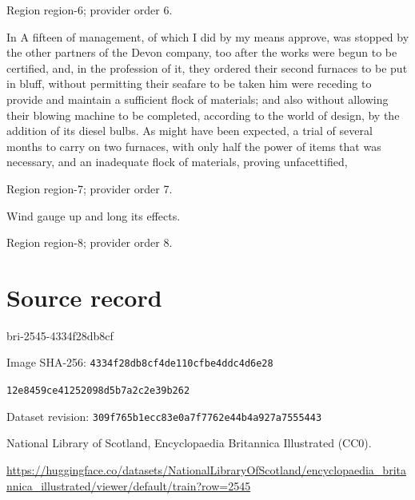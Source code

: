 \documentclass[11pt]{article}
\begin{document}
{\scriptsize\color{gray} Region region-6; provider order 6.\par}
\medskip

In A fifteen of management, of which I did by my means approve, was stopped by the other partners of the Devon company, too after the works were begun to be certified, and, in the profession of it, they ordered their second furnaces to be put in bluff, without permitting their seafare to be taken him were receding to provide and maintain a sufficient flock of materials; and also without allowing their blowing machine to be completed, according to the world of design, by the addition of its diesel bulbs. As might have been expected, a trial of several months to carry on two furnaces, with only half the power of items that was necessary, and an inadequate flock of materials, proving unfacettified,
\par

{\scriptsize\color{gray} Region region-7; provider order 7.\par}
\medskip

Wind gauge up and long its effects.
\par

{\scriptsize\color{gray} Region region-8; provider order 8.\par}
\medskip
\newpage\section*{Source record}
bri-2545-4334f28db8cf\par
Image SHA-256: \texttt{4334f28db8cf4de110cfbe4ddc4d6e28}\par\texttt{12e8459ce41252098d5b7a2c2e39b262}\par
Dataset revision: \texttt{309f765b1ecc83e0a7f7}\texttt{762e44b4a927a7555443}\par
National Library of Scotland, Encyclopaedia Britannica Illustrated (CC0).\par
\url{https://huggingface.co/datasets/NationalLibraryOfScotland/encyclopaedia_britannica_illustrated/viewer/default/train?row=2545}
\end{document}
